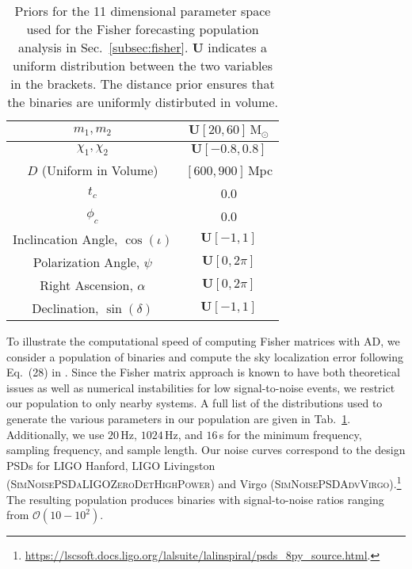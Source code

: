 \documentclass[twocolumn]{aastex631}
\begin{document}
\begin{table}[t]
    \centering
    \begin{tabular}{c|c}
    \hline\hline

    $m_1, m_2$ & $\boldsymbol{U}[20, 60]\, \mathrm{M}_\odot$ \\ \hline
    $\chi_1, \chi_2$ & $\boldsymbol{U}[-0.8, 0.8]$ \\ \hline
    $D$ (Uniform in Volume) & $[600, 900]$\,Mpc \\ \hline
    $t_c$ & 0.0 \\ \hline
    $\phi_c$ & 0.0 \\ \hline
    Inclincation Angle, $\cos(\iota)$ & $\boldsymbol{U}[-1, 1]$ \\ \hline
    Polarization Angle, $\psi$ & $\boldsymbol{U}[0, 2\pi]$ \\ \hline
    Right Ascension, $\alpha$ & $\boldsymbol{U}[0, 2\pi]$ \\ \hline
    Declination, $\sin(\delta)$ & $\boldsymbol{U}[-1, 1]$ \\ 
    \hline\hline
    \end{tabular}
    \caption{Priors for the 11 dimensional parameter space used for the Fisher forecasting population analysis in Sec.~\ref{subsec:fisher}. 
    $\boldsymbol{U}$ indicates a uniform distribution between the two variables in the brackets. 
    The distance prior ensures that the binaries are uniformly distirbuted in volume.
    }
    \label{tab:priors}
\end{table}

To illustrate the computational speed of computing Fisher matrices with AD, we consider a population of binaries and compute the sky localization error following Eq.~(28) in \cite{Iacovelli:2022bbs, Iacovelli:2022mbg}.
Since the Fisher matrix approach is known to have both theoretical issues as well as numerical instabilities for low signal-to-noise events, we restrict our population to only nearby systems.
A full list of the distributions used to generate the various parameters in our population are given in Tab.~\ref{tab:priors}. 
Additionally, we use $20\,$Hz, $1024\,$Hz, and $16\,$s for the minimum frequency, sampling frequency, and sample length.
Our noise curves correspond to the design PSDs for LIGO Hanford, LIGO Livingston (\textsc{SimNoisePSDaLIGOZeroDetHighPower}) and Virgo (\textsc{SimNoisePSDAdvVirgo}).\footnote{\url{https://lscsoft.docs.ligo.org/lalsuite/lalinspiral/psds_8py_source.html}.}
The resulting population produces binaries with signal-to-noise ratios ranging from $\mathcal{O}(10-10^2)$.
\end{document}
